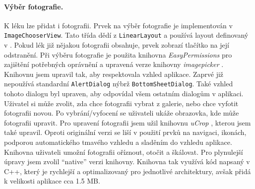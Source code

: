 \documentclass[../TakeYourPill.tex]{subfiles}
\begin{document}
\paragraph{Výběr fotografie.}
K léku lze přidat i fotografii. Prvek na výběr fotografie je implementován v \texttt{ImageChooserView}. Tato třída dědí z \texttt{LinearLayout} a používá layout definovaný v . Pokud lék již nějakou fotografii obsahuje, prvek zobrazí tlačítko na její odstranění. Při výběru fotografie je použita knihovna \textit{EasyPermissions} \cite{easy-permissions} pro zajištění potřebných oprávnění a upravená verze knihovny \textit{imagepicker} \cite{imagepicker}. Knihovnu jsem upravil tak, aby respektovala vzhled aplikace. Zaprvé již nepoužívá standardní \texttt{AlertDialog} nýbrž \texttt{BottomSheetDialog}. Také vzhled tohoto dialogu byl upraven, aby odpovídal všem ostatním dialogům v aplikaci. Uživatel si může zvolit, zda chce fotografii vybrat z galerie, nebo chce vyfotit fotografii novou. Po vybrání/vyfocení se uživateli ukáže obrazovka, kde může fotografii upravit. Pro upravení fotografii jsem užil knihovnu \textit{uCrop} \cite{ucrop}, kterou jsem také upravil. Oproti originální verzi se liší v použití prvků na navigaci, ikonách, podporou automatického tmavého vzhledu a sladěním do vzhledu aplikace. Knihovna uživateli umožní fotografii oříznout, otočit a škálovat. Pro plynulejší úpravy jsem zvolil \enquote{native} verzi knihovny. Knihovna tak využívá kód napsaný v C++, který je rychlejší a optimalizovaný pro jednotlivé architektury, avšak přidá k velikosti aplikace cca 1.5 MB.

\end{document}

